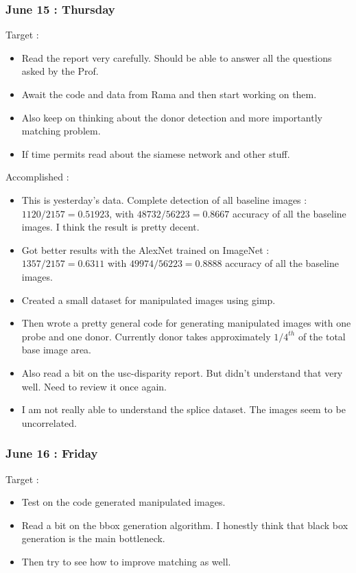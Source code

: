 \documentclass{article}
\begin{document}
\subsubsection{June 15 : Thursday}
Target :
\begin{itemize}
\item Read the report very carefully. Should be able to answer all the questions asked by the Prof.
\item Await the code and data from Rama and then start working on them.
\item Also keep on thinking about the donor detection and more importantly matching problem.
\item If time permits read about the siamese network and other stuff.
\end{itemize}

Accomplished :
\begin{itemize}
\item This is yesterday's data. Complete detection of all baseline images : $1120/2157 = 0.51923$, with $48732/56223 = 0.8667$ accuracy of all the baseline images. I think the result is pretty decent.
\item Got better results with the AlexNet trained on ImageNet : $1357/2157 = 0.6311$ with $49974/56223 = 0.8888$ accuracy of all the baseline images.
\item Created a small dataset for manipulated images using gimp.
\item Then wrote a pretty general code for generating manipulated images with one probe and one donor. Currently donor takes approximately $1/4^{th}$ of the total base image area.
\item Also read a bit on the usc-disparity report. But didn't understand that very well. Need to review it once again.
\item I am not really able to understand the splice dataset. The images seem to be uncorrelated. 
\end{itemize}

\subsubsection{June 16 : Friday}
Target :
\begin{itemize}
\item Test on the code generated manipulated images.
\item Read a bit on the bbox generation algorithm. I honestly think that black box generation is the main bottleneck.
\item Then try to see how to improve matching as well.
\end{itemize}
\end{document}

